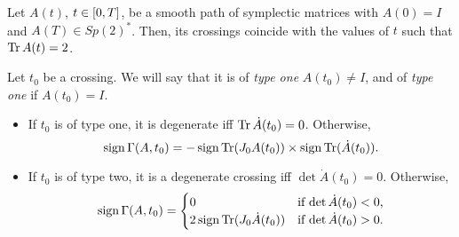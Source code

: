 \begin{prop}
Let $A(t)$, $t \in \interval0T$, be a smooth path of symplectic matrices with $A(0) = I$ and $A(T) \in Sp(2)^*$. Then, its crossings coincide with the values of $t$ such that $\operatorname{Tr} A(t) = 2$.

Let $t_0$ be a crossing. We will say that it is of \emph{type one} $A(t_0) \neq I$, and of \emph{type one} if $A(t_0) = I$.
\begin{itemize}
\item If $t_0$ is of type one, it is degenerate iff $\operatorname{Tr} \dot A(t_0) = 0$. Otherwise,
\begin{equation}
\operatorname{sign} \Gamma(A,t_0) = - \operatorname{sign} \operatorname{Tr}(J_0 A(t_0)) \times \operatorname{sign} \operatorname{Tr}(\dot A(t_0)).
\end{equation}

\item If $t_0$ is of type two, it is a degenerate crossing iff $\det \dot A(t_0) = 0$. Otherwise,
\begin{equation}
\operatorname{sign} \Gamma(A,t_0) = \begin{cases}
0 &\text{if $\det \dot A(t_0) < 0$,}\\
2 \operatorname{sign} \operatorname{Tr}(J_0 \dot A(t_0)) &\text{if $\det \dot A(t_0) > 0$.}
\end{cases}
\end{equation}
\end{itemize}
\end{prop}

